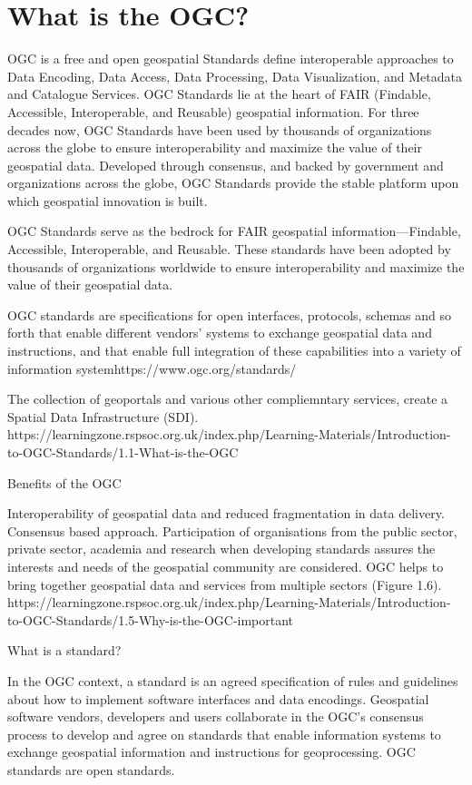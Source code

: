 \documentclass[class=scrbook, crop=false]{standalone}
\begin{document}
\section{What is the OGC?}
OGC is a free and open geospatial Standards define interoperable approaches to Data Encoding, Data Access, Data Processing, Data Visualization, and Metadata and Catalogue Services.  OGC Standards lie at the heart of FAIR (Findable, Accessible, Interoperable, and Reusable) geospatial information. For three decades now, OGC Standards have been used by thousands of organizations across the globe to ensure interoperability and maximize the value of their geospatial data. Developed through consensus, and backed by government and organizations across the globe, OGC Standards provide the stable platform upon which geospatial innovation is built. 

OGC Standards serve as the bedrock for FAIR geospatial information—Findable, Accessible, Interoperable, and Reusable.
These standards have been adopted by thousands of organizations worldwide to ensure interoperability and maximize the value of their geospatial data.


OGC standards are specifications for open interfaces, protocols, schemas and so forth that enable different vendors' systems to exchange geospatial data and instructions, and that enable full integration of these capabilities into a variety of information systemhttps://www.ogc.org/standards/ 

The collection of geoportals and various other compliemntary services, create a Spatial Data Infrastructure (SDI).
https://learningzone.rspsoc.org.uk/index.php/Learning-Materials/Introduction-to-OGC-Standards/1.1-What-is-the-OGC

Benefits of the OGC

    Interoperability of geospatial data and reduced fragmentation in data delivery.
    Consensus based approach. Participation of organisations from the public sector, private sector, academia and research when developing standards assures the interests and needs of the geospatial community are considered.
    OGC helps to bring together geospatial data and services from multiple sectors (Figure 1.6).
    https://learningzone.rspsoc.org.uk/index.php/Learning-Materials/Introduction-to-OGC-Standards/1.5-Why-is-the-OGC-important



What is a standard?

In the OGC context, a standard is an agreed specification of rules and guidelines about how to implement software interfaces and data encodings. Geospatial software vendors, developers and users collaborate in the OGC’s consensus process to develop and agree on standards that enable information systems to exchange geospatial information and instructions for geoprocessing. OGC standards are open standards.
\end{document}
